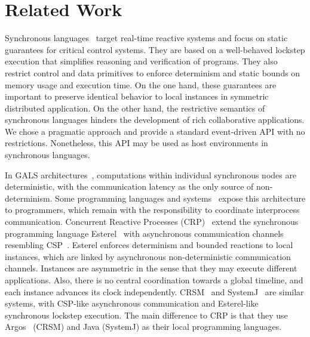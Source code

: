 \documentclass[sigplan,screen]{acmart}
\begin{document}
\section{Related Work}
\label{sec.related}

Synchronous languages~\cite{langs} target real-time reactive systems and focus
on static guarantees for critical control systems.
They are based on a well-behaved lockstep execution that simplifies reasoning
and verification of programs.
They also restrict control and data primitives to enforce determinism and
static bounds on memory usage and execution time.
On the one hand, these guarantees are important to preserve identical behavior
to local instances in symmetric distributed application.
On the other hand, the restrictive semantics of synchronous languages hinders
the development of rich collaborative applications.
We chose a pragmatic approach and provide a standard event-driven API with no
restrictions.
Nonetheless, this API may be used as host environments in synchronous
languages.

In GALS architectures~\cite{gals.taxonomy}, computations within individual
synchronous nodes are deterministic, with the communication latency as the only
source of non-determinism.
Some programming languages and systems~\cite{gals.crp,gals.crsm,gals.systemj}
expose this architecture to programmers, which remain with the responsibility
to coordinate interprocess communication.
%
Concurrent Reactive Processes (CRP)~\cite{gals.crp} extend the synchronous
programming language Esterel~\cite{esterel} with asynchronous communication
channels resembling CSP~\cite{csp}.
%
Esterel enforces determinism and bounded reactions to local instances, which
are linked by asynchronous non-deterministic communication channels.
Instances are asymmetric in the sense that they may execute different
applications.
Also, there is no central coordination towards a global timeline, and each
instance advances its clock independently.
%
CRSM~\cite{gals.crsm} and SystemJ~\cite{gals.systemj} are similar systems, with
CSP-like asynchronous communication and Esterel-like synchronous lockstep
execution.
The main difference to CRP is that they use Argos~\cite{argos} (CRSM) and Java
(SystemJ) as their local programming languages.
\end{document}
